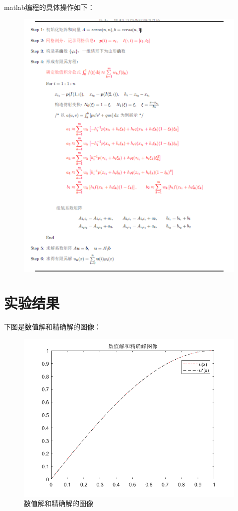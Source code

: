 \documentclass{article}
\begin{document}
\newpage
matlab编程的具体操作如下：
\begin{figure}[H]
\centering
\includegraphics[scale=1.2]{Steps.png}
\end{figure}

\newpage
\section{实验结果}

下图是数值解和精确解的图像：
\begin{figure}[H]
\centering
\includegraphics[scale=0.6]{Numerical solution image.png}
\caption{\label{Numerical solution image}数值解和精确解的图像}
\end{figure}
\end{document}
